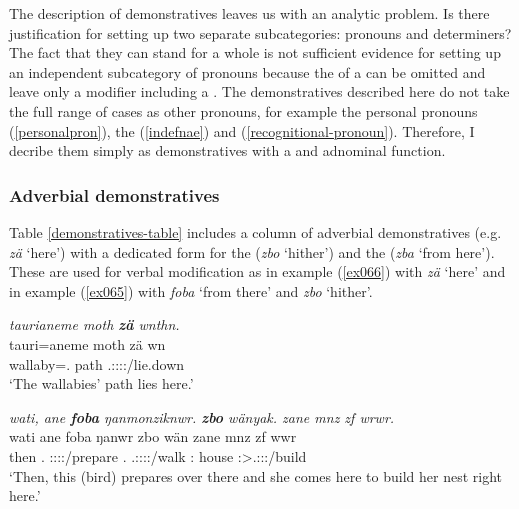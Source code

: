 The description of demonstratives leaves us with an analytic problem. Is there justification for setting up two separate subcategories:  pronouns and  determiners? The fact that they can stand for a whole  is not sufficient evidence for setting up an independent subcategory of  pronouns because the  of a  can be omitted and leave only a modifier including a  . The demonstratives described here do not take the full range of cases as other pronouns, for example the personal pronouns (\ref{personalpron}), the  (\ref{indefnae}) and   (\ref{recognitional-pronoun}). Therefore, I decribe them simply as demonstratives with a  and adnominal function.

\subsubsection{Adverbial demonstratives} \label{demadv}

Table \ref{demonstratives-table} includes a column of adverbial demonstratives (e.g. \emph{zä} `here') with a dedicated form for the  (\emph{zbo} `hither') and the   (\emph{zba} `from here'). These are used for verbal modification as in example (\ref{ex066}) with \emph{zä} `here' and in example (\ref{ex065}) with \emph{foba} `from there' and \emph{zbo} `hither'.

\begin{exe}
	\ex \emph{taurianeme moth \textbf{zä} wnthn.}\\
	\gll tauri=aneme moth zä wn\\
	wallaby=\Poss.\Nsg{} path \Prox{} \Tsg.\F:\Sbj:\Nonpast:\Ipfv:\Venit/lie.down\\
	\trans `The wallabies' path lies here.'
	\label{ex066}
\end{exe}
\begin{exe}
	\ex \emph{wati, ane \textbf{foba} ŋanmonziknwr. \textbf{zbo} wänyak. zane mnz zf wrwr.}\\
	\gll wati ane foba ŋanwr zbo wän zane mnz zf wwr\\
	then \Dem{} \Dist.\Abl{} \Stsg:\Sbj:\Nonpast:\Ipfv:\Venit/prepare \Prox.\All{} \Tsg.\F:\Sbj:\Nonpast:\Ipfv:\Venit/walk \Dem:\Prox{} house \Imm{} \Stsg:\Sbj>\Tsg.\F:\Obj:\Nonpast:\Ipfv/build\\
	\trans `Then, this (bird) prepares over there and she comes here to build her nest right here.'
	\label{ex065}
\end{exe}

